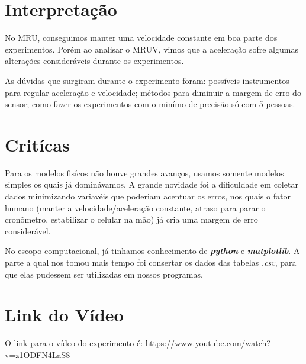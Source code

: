 \documentclass[a4paper, 12pt]{article}
\begin{document}
\section*{Interpretação}
No MRU, conseguimos manter uma velocidade constante em boa parte dos experimentos.
Porém ao analisar o MRUV, vimos que a aceleração sofre algumas alterações
consideráveis durante os experimentos.

As dúvidas que surgiram durante o experimento foram: possíveis instrumentos para
regular aceleração e velocidade; métodos para diminuir a margem de erro do
sensor; como fazer os experimentos com o minímo de precisão só com 5 pessoas.

\section*{Critícas}
Para os modelos fisícos não houve grandes avanços, usamos somente modelos
simples os quais já dominávamos. A grande novidade foi a dificuldade em coletar
dados minimizando variavéis que poderiam acentuar os erros, nos quais o fator
humano (manter a velocidade/aceleração constante, atraso para parar o
cronômetro, estabilizar o celular na mão) já cria uma margem de erro considerável. 

No escopo computacional, já tinhamos conhecimento de \textit{\textbf{python}} e
\textit{\textbf{matplotlib}}. A parte a qual nos tomou mais tempo foi consertar
os dados das tabelas \textit{.csv}, para que elas pudessem ser utilizadas em
nossos programas.

\section*{Link do Vídeo}
O link para o vídeo do experimento é:
\url{https://www.youtube.com/watch?v=z1ODFN4LaS8}
\end{document}
